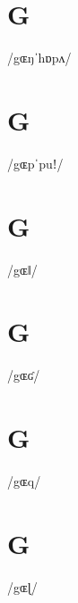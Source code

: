\documentclass[10pt,a4paper,twoside]{book}
\begin{document}
\section*{G}

\begin{multicols}{3}
 {/gɶŋˈhɒpʌ/} {}
\end{multicols}

\section*{G}

\begin{multicols}{3}
 {/gɶpˈpuǃ/} {}
\end{multicols}

\section*{G}

\begin{multicols}{3}
 {/gɶǁ/} {}
\end{multicols}

\section*{G}

\begin{multicols}{3}
 {/gɶʛ/} {}
\end{multicols}

\section*{G}

\begin{multicols}{3}
 {/gɶq/} {}
\end{multicols}

\section*{G}

\begin{multicols}{3}
 {/gɶɭ/} {}
\end{multicols}
\end{document}
